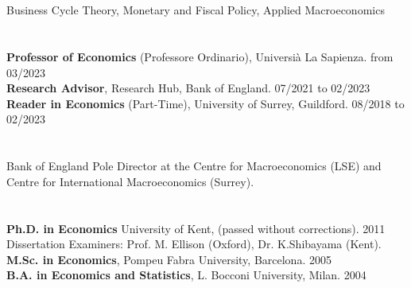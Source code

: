 \documentclass[margin, 11pt]{res} %
\begin{document}
\begin{resume}

\section{}
Business Cycle Theory, Monetary and Fiscal Policy, Applied Macroeconomics\\


\section{}
\textbf{Professor of Economics} (Professore Ordinario), Universi\`{a} La Sapienza. \hfill  from 03/2023\\
\textbf{Research Advisor}, Research Hub, Bank of England. \hfill  07/2021 to 02/2023\\
\textbf{Reader in Economics} (Part-Time), University of Surrey, Guildford. \hfill 08/2018 to 02/2023

\section{}
Bank of England Pole Director at the Centre for Macroeconomics (LSE) and Centre for International Macroeconomics (Surrey). 

\section{}
\textbf{Ph.D. in Economics} University of Kent,  (passed without corrections). \hfill 2011 \\
\hspace*{5mm}Dissertation Examiners:  Prof. M. Ellison (Oxford), Dr. K.Shibayama (Kent).\\
\textbf{M.Sc. in Economics}, Pompeu Fabra University, Barcelona.    \hfill 2005\\
\textbf{B.A. in Economics and Statistics},  L. Bocconi University, Milan.   \hfill 2004


\end{resume}
\end{document}
